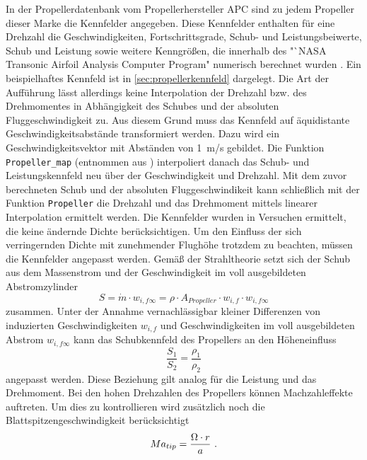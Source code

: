 In der Propellerdatenbank vom Propellerhersteller APC sind zu jedem Propeller dieser Marke die Kennfelder angegeben. Diese Kennfelder enthalten für eine Drehzahl die Geschwindigkeiten, Fortschrittsgrade, Schub- und Leistungsbeiwerte, Schub und Leistung sowie weitere Kenngrößen, die innerhalb des "`NASA Transonic Airfoil Analysis Computer Program"\; numerisch berechnet wurden \cite{apc.theory}. Ein beispielhaftes Kennfeld ist in \ref{sec:propellerkennfeld} dargelegt. Die Art der Aufführung lässt allerdings keine Interpolation der Drehzahl bzw. des Drehmomentes in Abhängigkeit des Schubes und der absoluten Fluggeschwindigkeit zu. Aus diesem Grund muss das Kennfeld auf äquidistante Geschwindigkeitsabstände transformiert werden. Dazu wird ein Geschwindigkeitsvektor mit Abständen von \SI{1}{m/s} gebildet. Die Funktion \texttt{Propeller\_map} (entnommen aus \cite{Beyer.2016}) interpoliert danach das Schub- und Leistungskennfeld neu über der Geschwindigkeit und Drehzahl. Mit dem zuvor berechneten Schub und der absoluten Fluggeschwindikeit kann schließlich mit der Funktion \texttt{Propeller} die Drehzahl und das Drehmoment mittels linearer Interpolation ermittelt werden.
Die Kennfelder wurden in Versuchen ermittelt, die keine ändernde Dichte berücksichtigen. Um den Einfluss der sich verringernden Dichte mit zunehmender Flughöhe trotzdem zu beachten, müssen die Kennfelder angepasst werden. Gemäß der Strahltheorie setzt sich der Schub aus dem Massenstrom und der Geschwindigkeit im voll ausgebildeten Abstromzylinder 
\begin{equation}
	S =  \dot{m}\cdot w_{i,f\infty} = \rho\cdot A_{Propeller}\cdot w_{i,f}\cdot w_{i,f\infty}
	\label{eq:propellerschub}
\end{equation}
zusammen. Unter der Annahme vernachlässigbar kleiner Differenzen von  induzierten Geschwindigkeiten \ensuremath{w_{i,f}} und Geschwindigkeiten im voll ausgebildeten Abstrom \ensuremath{w_{i,f\infty}} kann das Schubkennfeld des Propellers an den Höheneinfluss 
\begin{equation}
	\frac{S_1}{S_2} = \frac{\rho_1}{\rho_2}
\end{equation}
angepasst werden. Diese Beziehung gilt analog für die Leistung und das Drehmoment. 
Bei den hohen Drehzahlen des Propellers können Machzahleffekte auftreten. Um dies zu kontrollieren wird zusätzlich noch die Blattspitzengeschwindigkeit berücksichtigt
\begin{equation}
	Ma_{tip} = \frac{\Omega\cdot r}{a} ~\text{.}
\end{equation}


